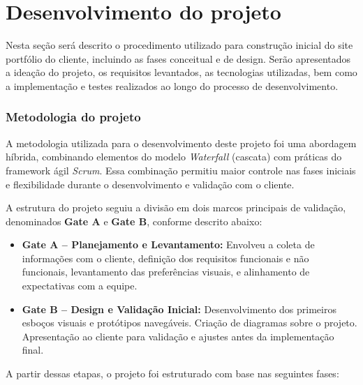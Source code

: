 \chapter{Desenvolvimento do projeto}
\label{chap:metod}

Nesta seção será descrito o procedimento utilizado para construção inicial do site portfólio do cliente, incluindo as fases conceitual e de design. Serão apresentados a ideação do projeto, os requisitos levantados, as tecnologias utilizadas, bem como a implementação e testes realizados ao longo do processo de desenvolvimento.

\subsection{Metodologia do projeto}
A metodologia utilizada para o desenvolvimento deste projeto foi uma abordagem híbrida, combinando elementos do modelo \textit{Waterfall} (cascata) com práticas do framework ágil \textit{Scrum}. Essa combinação permitiu maior controle nas fases iniciais e flexibilidade durante o desenvolvimento e validação com o cliente.

A estrutura do projeto seguiu a divisão em dois marcos principais de validação, denominados \textbf{Gate A} e \textbf{Gate B}, conforme descrito abaixo:

\begin{itemize}
    \item \textbf{Gate A – Planejamento e Levantamento:} Envolveu a coleta de informações com o cliente, definição dos requisitos funcionais e não funcionais, levantamento das preferências visuais, e alinhamento de expectativas com a equipe.
    
    \item \textbf{Gate B – Design e Validação Inicial:} Desenvolvimento dos primeiros esboços visuais e protótipos navegáveis. Criação de diagramas sobre o projeto. Apresentação ao cliente para validação e ajustes antes da implementação final.
\end{itemize}

A partir dessas etapas, o projeto foi estruturado com base nas seguintes fases:

